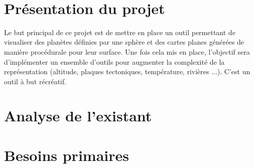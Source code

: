 \documentclass[a4paper]{article}
\begin{document}
\begin{titlepage}
{\begin{minipage}{0.4\textwidth}
\begin{center}
\end{center}
\end{minipage}
~
}







\vfill %

\end{titlepage}

\newpage

\section{Présentation du projet}

Le but principal de ce projet est de mettre en place un outil permettant de visualiser des planètes définies par une sphère et des cartes planes générées de manière procédurale pour leur surface. Une fois cela mis en place, l'objectif sera d'implémenter un ensemble d'outils pour augmenter la complexité de la représentation (altitude, plaques tectoniques, température, rivières ...). C'est un outil à but récréatif.

\section{Analyse de l'existant}

\section{Besoins primaires}
\end{document}
